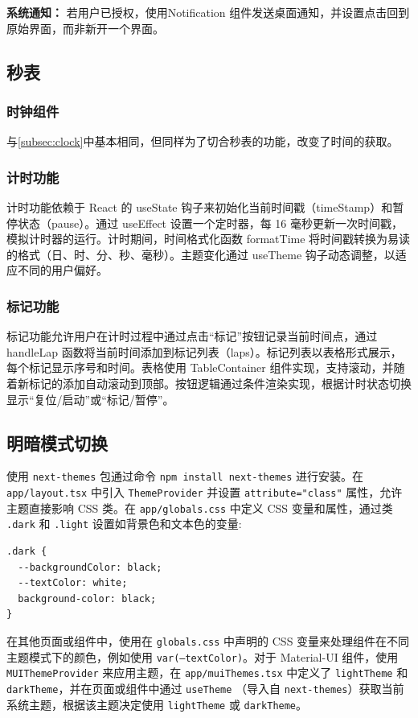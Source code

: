 \documentclass[a4paper,11pt]{article}
\begin{document}
\textbf{系统通知：}
若用户已授权，使用Notification 组件发送桌面通知，并设置点击回到原始界面，而非新开一个界面。
\subsection{秒表}
\subsubsection{时钟组件}
与\ref{subsec:clock}中基本相同，但同样为了切合秒表的功能，改变了时间的获取。
\subsubsection{计时功能}
计时功能依赖于 React 的 useState 钩子来初始化当前时间戳（timeStamp）和暂停状态（pause）。通过 useEffect 设置一个定时器，每 16 毫秒更新一次时间戳，模拟计时器的运行。计时期间，时间格式化函数 formatTime 将时间戳转换为易读的格式（日、时、分、秒、毫秒）。主题变化通过 useTheme 钩子动态调整，以适应不同的用户偏好。
\subsubsection{标记功能}
标记功能允许用户在计时过程中通过点击“标记”按钮记录当前时间点，通过 handleLap 函数将当前时间添加到标记列表（laps）。标记列表以表格形式展示，每个标记显示序号和时间。表格使用 TableContainer 组件实现，支持滚动，并随着新标记的添加自动滚动到顶部。按钮逻辑通过条件渲染实现，根据计时状态切换显示“复位/启动”或“标记/暂停”。
\subsection{明暗模式切换}
使用 \texttt{next-themes} 包通过命令 \texttt{npm install next-themes} 进行安装。在 \texttt{app/layout.tsx} 中引入 \texttt{ThemeProvider} 并设置 \texttt{attribute="class"} 属性，允许主题直接影响 CSS 类。在 \texttt{app/globals.css} 中定义 CSS 变量和属性，通过类 \texttt{.dark} 和 \texttt{.light} 设置如背景色和文本色的变量:
\begin{verbatim}
.dark {
  --backgroundColor: black;
  --textColor: white;
  background-color: black;
}
\end{verbatim}

在其他页面或组件中，使用在 \texttt{globals.css} 中声明的 CSS 变量来处理组件在不同主题模式下的颜色，例如使用 \texttt{var(--textColor)}。对于 Material-UI 组件，使用 \texttt{MUIThemeProvider} 来应用主题，在 \texttt{app/muiThemes.tsx} 中定义了 \texttt{lightTheme} 和 \texttt{darkTheme}，并在页面或组件中通过 \texttt{useTheme} （导入自 \texttt{next-themes}）获取当前系统主题，根据该主题决定使用 \texttt{lightTheme} 或 \texttt{darkTheme}。
\end{document}
